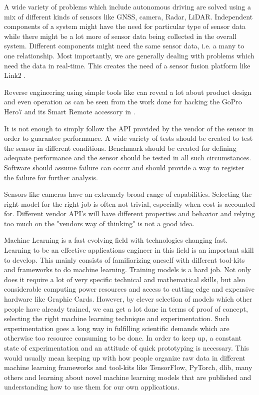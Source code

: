 \documentclass[a4paper, 12pt, oneside]{report}
\begin{document}
  A wide variety of problems which include autonomous driving are solved using a mix of different kinds of sensors like GNSS, camera, Radar, LiDAR. Independent components of a system might have the need for particular type of sensor data while there might be a lot more of sensor data being collected in the overall system. Different components might need the same sensor data, i.e. a many to one relationship. Most importantly, we are generally dealing with problems which need the data in real-time. This creates the need of a sensor fusion platform like Link2 \cite{ReactiveMeshforRealtimeDataProcessingDRAIVELinkDocumentation-2019-12-09}.
  
  Reverse engineering using simple tools like \cite{Aircrackng-2020-02-12} can reveal a lot about product design and even operation as can be seen from the work done for hacking the GoPro Hero7 \cite{GoProHERO7BlackInsanelysmooth4kVideo-2020-02-12} and its Smart Remote \cite{GoProSmartRemoteControl-2020-02-12} accessory in \cite{NumericalAdvantageGoProHackHackingtheWirelessUDPcommunicationbetweenGoProHero7andSmartRemotedevice-2020-02-20}.
  
  It is not enough to simply follow the API provided by the vendor of the sensor in order to guarantee performance. A wide variety of tests should be created to test the sensor in different conditions. Benchmark should be created for defining adequate performance and the sensor should be tested in all such circumstances. Software should assume failure can occur and should provide a way to register the failure for further analysis.
  
  Sensors like cameras have an extremely broad range of capabilities. Selecting the right model for the right job is often not trivial, especially when cost is accounted for. Different vendor API's will have different properties and behavior and relying too much on the "vendors way of thinking" is not a good idea. 
  
  Machine Learning is a fast evolving field with technologies changing fast. Learning to be an effective applications engineer in this field is an important skill to develop. This mainly consists of familiarizing oneself with different tool-kits and frameworks to do machine learning. Training models is a hard job. Not only does it require a lot of very specific technical and mathematical skills, but also considerable computing power resources and access to cutting edge and expensive hardware like Graphic Cards. However, by clever selection of models which other people have already trained, we can get a lot done in terms of proof of concept, selecting the right machine learning technique and experimentation. Such experimentation goes a long way in fulfilling scientific demands which are otherwise too resource consuming to be done. In order to keep up, a constant state of experimentation and an attitude of quick prototyping is necessary. This would usually mean keeping up with how people organize raw data in different machine learning frameworks and tool-kits like TensorFlow, PyTorch, dlib, many others and learning about novel machine learning models that are published and understanding how to use them for our own applications. 
  
\end{document}
